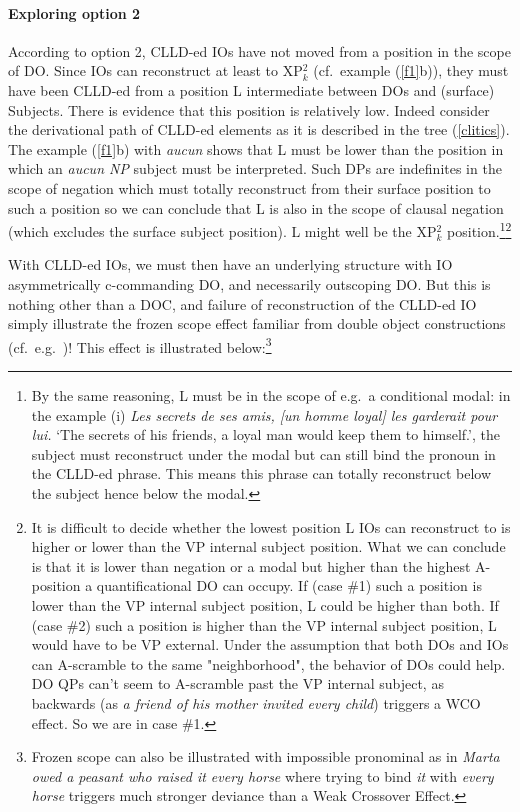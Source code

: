 \documentclass[output=paper]{langsci/langscibook}
\begin{document}
\paragraph*{Exploring option 2} According to option 2, \gls{CLLD}-ed \glspl{IO}
have not moved from a position in the scope of DO. Since \glspl{IO} can
reconstruct at least to XP$_k^2$ (cf.\ example (\ref{f1}b)), they must have
been \gls{CLLD}-ed from a position L intermediate between \glspl{DO} and
(surface) Subjects. There is evidence that this position is relatively low.
Indeed consider the derivational path of \gls{CLLD}-ed elements as it is
described in the tree (\ref{clitics}). The example (\ref{f1}b) with {\it aucun}
shows that L must be lower than the position in which an {\it aucun NP} subject
must be interpreted. Such DPs are indefinites in the scope of negation which
must totally reconstruct from their surface position to such a position so we
can conclude that L is also in the scope of clausal negation (which excludes
the surface subject position). L might well be the XP$_k^2$
position.\footnote{By the same reasoning, L must be in the scope of e.g.\ a
    conditional modal: in the example (i) \emph{Les secrets de
    ses amis, [un homme loyal] les garderait pour
lui.} \enquote*{The secrets of his friends, a loyal man would keep them to
himself.}, the subject must reconstruct under the modal but can still bind the
pronoun in the CLLD-ed  phrase. This means this phrase can totally reconstruct
below the subject hence below the modal.}\multiplefootnoteseparator\footnote{It
is difficult to decide whether the lowest position L \glspl{IO} can reconstruct
to is higher or lower than the VP internal subject position. What we can
conclude is that it is lower than negation or a modal but higher than the
highest A-position a quantificational DO can occupy. If (case \#1) such a
position is lower than the VP internal subject position, L could be higher than
both.  If (case \#2) such a position is higher  than the VP internal subject
position, L would have to be VP external.  Under the assumption that both
\glspl{DO} and \glspl{IO} can A-scramble to the same "neighborhood", the
behavior of \glspl{DO} could help. DO QPs can't seem to A-scramble past the VP
internal subject, as backwards   (as {\it a friend of
his mother invited every child}) triggers a
\gls{WCO} effect. So we are in case \#1.}

With \gls{CLLD}-ed \glspl{IO}, we must then have an underlying structure with
IO asymmetrically c-commanding DO, and necessarily outscoping DO. But this is
nothing other than a DOC, and failure of reconstruction of the \gls{CLLD}-ed IO
simply illustrate the frozen scope effect familiar from  double
object constructions (cf.\ e.g.\ \citealt{Larson:1988})! This effect is illustrated
below:\footnote{Frozen scope can also be illustrated with  impossible
    pronominal  as in {\it Marta owed a peasant who raised it every
    horse} where trying to bind {\it it} with {\it every  horse} triggers much
stronger deviance than a Weak Crossover Effect.}
\end{document}
